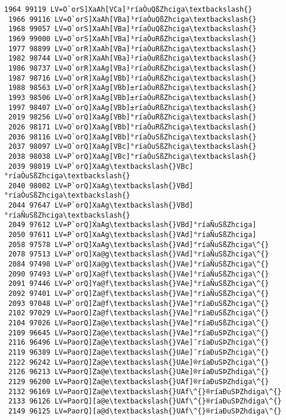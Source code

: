 \documentclass[11pt]{article}
\begin{document}
\begin{Verbatim}[commandchars=\\\{\}]
 1964 99119 LV=O`orS]XaAh[VCa]³ríaÒuQßZhciga\textbackslash{}
 1966 99116 LV=O`orS]XaAh[VBa]³ríaÒuQßZhciga\textbackslash{}
 1968 99057 LV=O`orS]XaAh[VBa]³ríaÒuQßZhciga\textbackslash{}
 1969 99000 LV=O`orS]XaAh[VBa]³ríaÒuRßZhciga\textbackslash{}
 1977 98899 LV=O`orR]XaAh[VBa]³ríaÒuRßZhciga\textbackslash{}
 1982 98744 LV=O`orR]XaAh[VBa]²ríaÒuRßZhciga\textbackslash{}
 1986 98737 LV=O`orR]XaAg[VBa]²ríaÒuRßZhciga\textbackslash{}
 1987 98716 LV=O`orR]XaAg[VBb]²ríaÒuRßZhciga\textbackslash{}
 1988 98563 LV=O`orR]XaAg[VBb]±ríaÒuRßZhciga\textbackslash{}
 1993 98506 LV=O`orR]XaAg[VBb]±ríaÒuRßZhciga\textbackslash{}
 1997 98407 LV=O`orQ]XaAg[VBb]±ríaÒuRßZhciga\textbackslash{}
 2019 98256 LV=O`orQ]XaAg[VBb]°ríaÒuRßZhciga\textbackslash{}
 2026 98171 LV=O`orQ]XaAg[VBb]°ríaÒuRßZhciga\textbackslash{}
 2036 98116 LV=O`orQ]XaAg[VBb]°ríaÒuSßZhciga\textbackslash{}
 2037 98097 LV=O`orQ]XaAg[VBc]°ríaÒuSßZhciga\textbackslash{}
 2038 98038 LV=P`orQ]XaAg[VBc]°ríaÒuSßZhciga\textbackslash{}
 2039 98019 LV=P`orQ]XaAg\textbackslash{}VBc]°ríaÒuSßZhciga\textbackslash{}
 2040 98002 LV=P`orQ]XaAg\textbackslash{}VBd]°ríaÒuSßZhciga\textbackslash{}
 2044 97647 LV=P`orQ]XaAg\textbackslash{}VBd]°ríaÑuSßZhciga\textbackslash{}
 2049 97612 LV=P`orQ]XaAg\textbackslash{}VBd]°ríaÑuSßZhciga]
 2050 97611 LV=P`orQ]XaAg\textbackslash{}VAd]°ríaÑuSßZhciga]
 2058 97578 LV=P`orQ]XaAg\textbackslash{}VAd]°ríaÑuSßZhciga\^{}
 2078 97513 LV=P`orQ]Xa@g\textbackslash{}VAd]°ríaÑuSßZhciga\^{}
 2084 97498 LV=P`orQ]Xa@g\textbackslash{}VAe]°ríaÑuSßZhciga\^{}
 2090 97493 LV=P`orQ]Xa@f\textbackslash{}VAe]°ríaÑuSßZhciga\^{}
 2091 97446 LV=P`orQ]Ya@f\textbackslash{}VAe]°ríaÑuSßZhciga\^{}
 2092 97401 LV=P`orQ]Za@f\textbackslash{}VAe]°ríaÑuSßZhciga\^{}
 2093 97048 LV=P`orQ]Za@f\textbackslash{}VAe]°ríaÐuSßZhciga\^{}
 2102 97029 LV=PaorQ]Za@f\textbackslash{}VAe]°ríaÐuSßZhciga\^{}
 2104 97026 LV=PaorQ]Za@e\textbackslash{}VAe]°ríaÐuSßZhciga\^{}
 2109 96645 LV=PaorQ]Za@e\textbackslash{}VAe]°ríaÐuSÞZhciga\^{}
 2116 96496 LV=PaorQ]Za@e\textbackslash{}VAe]¯ríaÐuSÞZhciga\^{}
 2119 96389 LV=PaorQ]Za@e\textbackslash{}UAe]¯ríaÐuSÞZhciga\^{}
 2122 96242 LV=PaorQ]Za@e\textbackslash{}UAe]®ríaÐuSÞZhciga\^{}
 2126 96213 LV=PaorQ]Za@e\textbackslash{}UAe]®ríaÐuSÞZhdiga\^{}
 2129 96200 LV=PaorQ]Za@e\textbackslash{}UAf]®ríaÐuSÞZhdiga\^{}
 2132 96169 LV=PaorQ]Za@e\textbackslash{}UAf\^{}®ríaÐuSÞZhdiga\^{}
 2133 96126 LV=PaorQ][a@e\textbackslash{}UAf\^{}®ríaÐuSÞZhdiga\^{}
 2149 96125 LV=PaorQ][a@d\textbackslash{}UAf\^{}®ríaÐuSÞZhdiga\^{}

\end{Verbatim}
\end{document}
